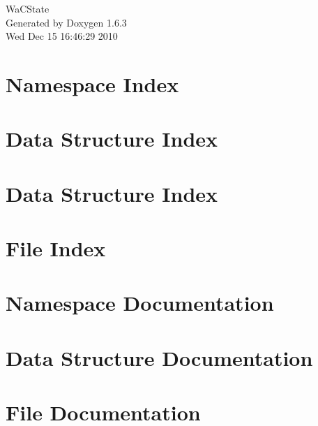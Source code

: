 \documentclass[a4paper]{book}
\begin{document}
\hypersetup{pageanchor=false}
\begin{titlepage}
\vspace*{7cm}
\begin{center}
{\Large WaCState }\\
\vspace*{1cm}
{\large Generated by Doxygen 1.6.3}\\
\vspace*{0.5cm}
{\small Wed Dec 15 16:46:29 2010}\\
\end{center}
\end{titlepage}
\clearemptydoublepage
{}
\tableofcontents
\clearemptydoublepage
{}
\hypersetup{pageanchor=true}
\chapter{Namespace Index}

\chapter{Data Structure Index}

\chapter{Data Structure Index}

\chapter{File Index}

\chapter{Namespace Documentation}






\chapter{Data Structure Documentation}









\chapter{File Documentation}









\printindex
\end{document}
